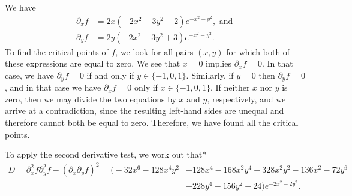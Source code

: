\documentclass{watsonbook}
\begin{document}
  \begin{solution}
    We have
    \begin{align*}
      \partial_x f &= 2 x \left(- 2 x^{2} - 3 y^{2} + 2\right) e^{-
      x^{2} - y^{2}}, \text{ and }\\
    \partial_y f &= 2 y \left(- 2 x^{2} - 3 y^{2} + 3\right) e^{-
      x^{2} - y^{2}}.
    \end{align*}
    To find the critical points of $f$, we look for all pairs $(x,y)$
    for which both of these expressions are equal to zero. We see that
    $x=0$ implies $\partial_x f = 0$. In that case, we have
    $\partial_y f = 0$ if and only if $y \in \{-1,0,1\}$. Similarly,
    if $y = 0$ then $\partial_y f = 0$, and in that case we have
    $\partial_x f = 0$ only if $x \in \{-1,0,1\}$. If neither $x$ nor
    $y$ is zero, then we may divide the two equations by $x$ and $y$,
    respectively, and we arrive at a contradiction, since the
    resulting left-hand sides are unequal and therefore cannot both be
    equal to zero. Therefore, we have found all the critical points.

    To apply the second derivative test, we work out that*
    \begin{align*}
      D = \partial_x^2 f \partial_y^2 f - (\partial_x\partial_{y} f)^2 =
      \bigg(- 32 x^{6} - 128 x^{4} y^{2} &+ 128 x^{4} - 168 x^{2} y^{4}
        + 328 x^{2} y^{2} - 136 x^{2} - 72 y^{6} \\ &+ 228 y^{4} - 156
        y^{2} + 24\bigg) e^{-2x^2 - 2y^2}. 
    \end{align*}


\end{solution}
\end{document}
